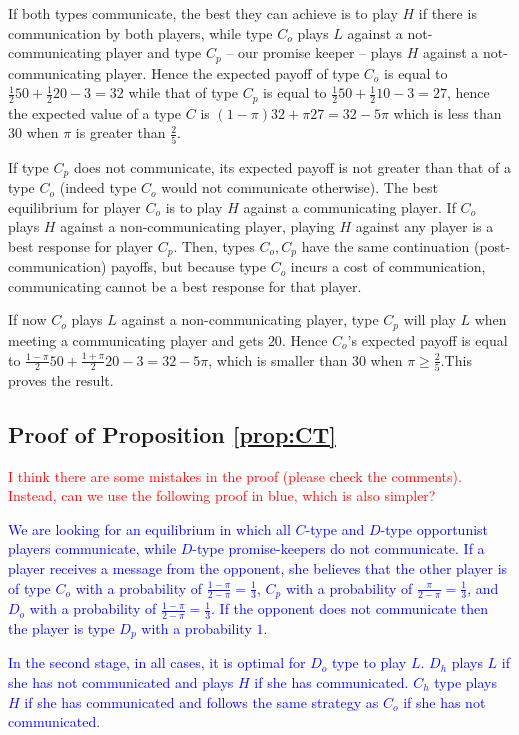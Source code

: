 \documentclass[12pt]{article}
\theoremstyle{break}
\begin{document}
	If both types communicate, the best they can achieve is to play $H$ if there is communication by both players, while type $C_o$ plays $L$ against a not-communicating player and type $C_p$ -- our promise keeper -- plays $H$ against a not-communicating player. Hence the expected payoff of type $C_o$ is equal to $\frac{1}{2}50+\frac{1}{2}20-3=32$ while that of type $C_p$ is equal to $\frac{1}{2}50+\frac{1}{2}10-3=27$, hence the expected value of a type $C$ is $(1-\pi)32+\pi 27=32-5\pi$ which is less than $30$ when $\pi$ is greater than $\frac{2}{5}$. 

	If type $C_p$ does not communicate, its expected payoff is not greater than that of a type $C_o$ (indeed type $C_o$ would not communicate otherwise). The best equilibrium for player $C_o$ is to play $H$ against a communicating player. If $C_o$ plays $H$ against a non-communicating player, playing $H$ against any player is a best response for player $C_p$. Then, types $C_o,C_p$ have the same continuation (post-communication) payoffs, but because type $C_o$ incurs a cost of communication, communicating cannot be a best response for that player. 
	
	If now $C_o$ plays $L$ against a non-communicating player, type $C_p$ will play $L$ when meeting a communicating player and gets $20$.  Hence $C_o$'s expected payoff is equal to $\frac{1-\pi}{2}50+\frac{1+\pi}{2}20-3=32-5\pi$, which is smaller than $30$ when $\pi\geq \frac{2}{5}$.This proves the result.


\subsection*{Proof of Proposition \ref{prop:CT}}
\textcolor{red}{I think there are some mistakes in the proof (please check the comments). Instead, can we use the following proof in blue, which is also simpler?}

\textcolor{blue}{We are looking for an equilibrium in which all $C$-type and $D$-type opportunist players communicate, while $D$-type promise-keepers do not communicate. If a player receives a message from the opponent, she believes that the other player is of type $C_o$ with a probability of $\frac{1-\pi}{2-\pi}=\frac{1}{3}$, $C_p$ with a probability of $\frac{\pi}{2-\pi}=\frac{1}{3}$, and $D_o$ with a probability of $\frac{1-\pi}{2-\pi}=\frac{1}{3}$. If the opponent does not communicate then the player is type $D_p$ with a probability $1$.}

\textcolor{blue}{In the second stage, in all cases, it is optimal for $D_o$ type to play $L$. $D_h$ plays $L$ if she has not communicated and plays $H$ if she has communicated. $C_h$ type plays $H$ if she has communicated and follows the same strategy as $C_o$ if she has not communicated.}
\end{document}
